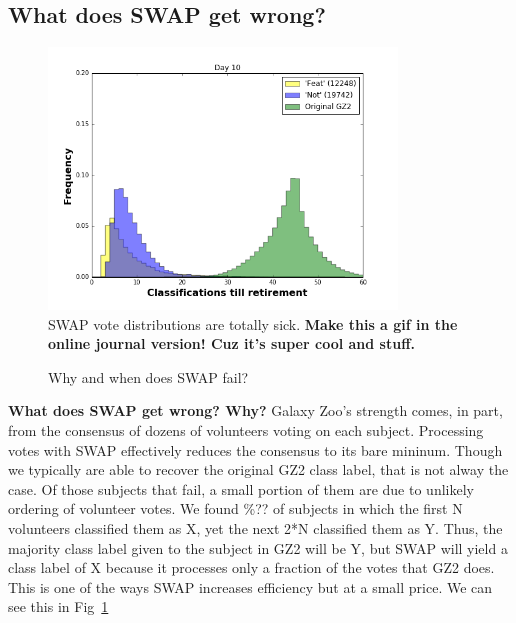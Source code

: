 \documentclass[twocolumn]{aastex6}
\begin{document}
\subsection{What does SWAP get wrong?}
\begin{figure}[t!]
\includegraphics[width=3.65in]{figures/clicks_till_retirement_GZ2_sup_PLPD5_p5_flipfeature2b_10.png}
\caption{SWAP vote distributions are totally sick. \textbf{Make this a gif in the online journal version! Cuz it's super cool and stuff. }\label{fig: swap vote distributions}}
\end{figure}

\begin{figure}[t!]
\caption{Why and when does SWAP fail?  \label{fig: SWAP sucks}}
\end{figure}

\textbf{What does SWAP get wrong? Why? }
Galaxy Zoo's strength comes, in part, from
the consensus of dozens of volunteers voting on each subject. Processing votes
with SWAP effectively reduces the consensus to its bare mininum. Though we typically
are able to recover the original GZ2 class label, that is not alway the case. Of those 
subjects that fail, a small portion of them are due to unlikely ordering of volunteer
votes. We found \%?? of subjects in which the first N volunteers classified them as X, 
yet the next 2*N classified them as Y. Thus, the majority class label given to the subject 
in GZ2 will be Y, but SWAP will yield a class label of X because it processes only a fraction
of the votes that GZ2 does. This is one of the ways SWAP increases efficiency but at a 
small price. We can see this in Fig~\ref{fig: swap vote distributions}
\end{document}
